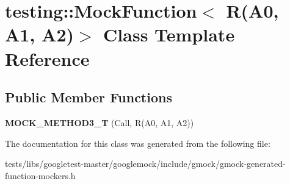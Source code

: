 \hypertarget{classtesting_1_1MockFunction_3_01R_07A0_00_01A1_00_01A2_08_4}{}\section{testing\+:\+:Mock\+Function$<$ R(A0, A1, A2)$>$ Class Template Reference}
\label{classtesting_1_1MockFunction_3_01R_07A0_00_01A1_00_01A2_08_4}
\subsection*{Public Member Functions}
\begin{DoxyCompactItemize}
\item 
\mbox{\label{classtesting_1_1MockFunction_3_01R_07A0_00_01A1_00_01A2_08_4_afcc79eab94b7d873f71ccf7b08ce582f}} 
{\bfseries M\+O\+C\+K\+\_\+\+M\+E\+T\+H\+O\+D3\+\_\+T} (Call, R(A0, A1, A2))
\end{DoxyCompactItemize}


The documentation for this class was generated from the following file\+:\begin{DoxyCompactItemize}
\item 
tests/libs/googletest-\/master/googlemock/include/gmock/gmock-\/generated-\/function-\/mockers.\+h\end{DoxyCompactItemize}

